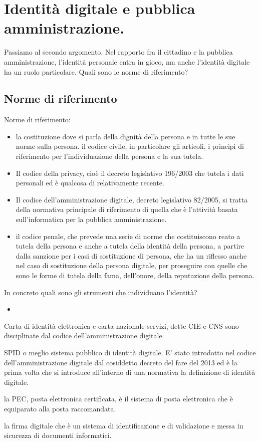  \section{Identità digitale e pubblica amministrazione.}
 Passiamo al secondo argomento.  Nel rapporto fra il cittadino e la pubblica amministrazione, l'identità personale  entra in gioco, ma anche l'identità digitale ha un ruolo particolare. Quali sono le norme di riferimento?\par
 \subsection{Norme di riferimento}
 Norme di riferimento:
\begin{itemize}
    \item la costituzione dove si parla della dignità della persona e in tutte le sue norme sulla persona. il codice civile, in particolare gli articoli, i principi di riferimento per l'individuazione della persona e la sua tutela. 
     \item Il codice della privacy, cioè il decreto legislativo 196/2003 che tutela i dati personali ed è qualcosa di relativamente recente. 
    \item Il codice dell'amministrazione digitale, decreto legislativo 82/2005, si tratta della normativa principale di riferimento di quella che è l'attività basata sull'informatica per la pubblica amministrazione. 
    \item il codice penale, che prevede una serie di norme che costituiscono reato a tutela della persona e anche a tutela della identità della persona, a partire dalla sanzione per i casi di sostituzione di persona, che ha un riflesso anche nel caso di sostituzione della persona digitale, per proseguire con quelle che sono le forme di tutela della fama, dell'onore, della reputazione della persona.  
\end{itemize}
 
 In concreto quali sono gli strumenti che individuano l'identità? 
 
 \begin{itemize}
     \item 
 \end{itemize}
 Carta di identità elettronica e carta nazionale servizi, dette CIE e CNS sono disciplinate dal codice dell'amministrazione digitale.
 \item SPID o meglio sistema pubblico di identità digitale. E' stato introdotto nel codice dell'amministrazione digitale dal cosiddetto decreto del fare del 2013 ed è la prima volta che si introduce all'interno di una normativa la definizione di identità digitale. 
 \item la PEC, posta elettronica certificata, è il sistema di posta elettronica che è equiparato alla posta raccomandata. 
 \item la firma digitale che è un sistema di identificazione e di validazione e messa in sicurezza di documenti informatici. 
 
